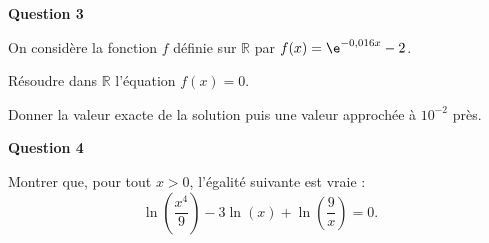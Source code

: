 \bigskip

\textbf{Question 3}

\medskip

On considère la fonction $f$ définie sur $\mathbb{R}$ par $f(x) = \e^{-0,016x} - 2$.

Résoudre dans $\mathbb{R}$ l'équation $f(x) = 0$.

Donner la valeur exacte de la solution puis une valeur approchée à $10^{-2}$ près.

\bigskip

\textbf{Question 4}

\medskip

Montrer que, pour tout $x > 0$, l'égalité suivante est vraie :
\[\ln\left(\dfrac{x^4}{9}\right) - 3 \ln(x) + \ln\left(\dfrac{9}{x}\right) = 0.\]

\bigskip
